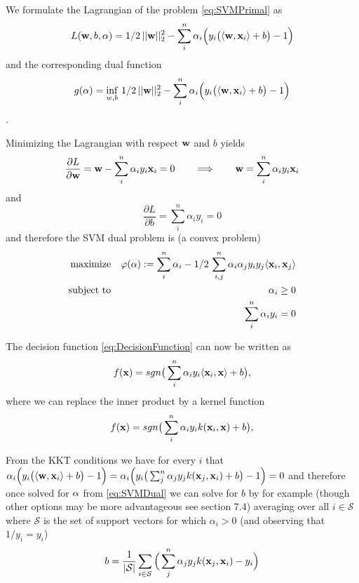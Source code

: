 We formulate the Lagrangian of the problem \eqref{eq:SVMPrimal} as
\begin{equation}\label{eq:SVMLagrangian}\index{SVM Lagrangian}
  L(\vc{w},b,\vc{\alpha}) =  1/2 \, ||\vc{w}||_2^2 
- \sum_i^n \alpha_i \Big( y_i \big( \langle \vc{w},\vc{x}_i \rangle + b \big) - 1 \Big)
\end{equation}
and the corresponding dual function
\begin{equation}\label{eq:SVMDualFce}\index{SVM dual function}
  g(\vc{\alpha}) =  \inf_{w,b} \, 1/2 \, ||\vc{w}||_2^2 
- \sum_i^n \alpha_i \Big( y_i \big( \langle \vc{w},\vc{x}_i \rangle + b \big) - 1 \Big)
\end{equation}.

Minimizing the Lagrangian with respect $\mathbf{w}$ and $b$ yields
\begin{equation}
 \frac{\partial{L}}{\partial{\mathbf{w}}} = \mathbf{w} - \sum_i^n \alpha_i y_i \mathbf{x}_i = 0 \qquad \Longrightarrow \qquad \mathbf{w} = \sum_i^n \alpha_i y_i \mathbf{x}_i
\end{equation}
and
\begin{equation}
 \frac{\partial{L}}{\partial{b}} = \sum_i^n \alpha_i y_i = 0
\end{equation}
and therefore the SVM dual problem is (a convex problem)
\begin{eqnarray}\label{eq:SVMDual}\index{SVM dual problem}
  \text{maximize}  & & \varphi(\vc{\alpha}):= \sum_i^n \alpha_i - 1/2 \, \sum_{i,j}^n \alpha_i \alpha_j y_i y_j \langle \vc{x}_i, \vc{x}_j \rangle \\
  \text{subject to} & & \alpha_i \geq 0 \\
   & & \sum_i^n \alpha_i y_i = 0
\end{eqnarray}

The decision function \eqref{eq:DecisionFunction} can now be written as
\begin{equation}\label{eq:DecisionFunction2}
 f(\mathbf{x}) = sgn \big( \sum_i^n \alpha_i y_i \langle \mathbf{x}_i, \mathbf{x} \rangle + b \big),
\end{equation}
where we can replace the inner product by a kernel function
\begin{equation}\label{eq:DecisionFunctionKernel}
 f(\mathbf{x}) = sgn \big( \sum_i^n \alpha_i y_i k( \mathbf{x}_i, \mathbf{x} ) + b \big),
\end{equation}

From the KKT conditions we have for every $i$ that $ \alpha_i \Big( y_i \big( \langle \mathbf{w},\mathbf{x}_i \rangle + b \big) - 1 \Big) = \alpha_i \Big( y_i \big( \sum_j^n \alpha_j y_j k(\mathbf{x}_j,\mathbf{x}_i) + b \big) - 1 \Big) = 0$ and therefore once solved for $\mathbf{\alpha}$ from \eqref{eq:SVMDual} we can solve for $b$ by for example (though other options may be more advantageous see \cite{Scholkopf2002} section 7.4) averaging over all $i \in \mathcal{S}$ where $\mathcal{S}$ is the set of support vectors for which $\alpha_i > 0$ (and observing that $1/y_i = y_i$)
\begin{equation}\label{eq:SolveForB}
b = \frac{1}{|\mathcal{S}|} \sum_{i \in \mathcal{S}} \Big( \sum_j^n \alpha_j y_j k(\mathbf{x}_j,\mathbf{x}_i) - y_i \Big)
\end{equation}


